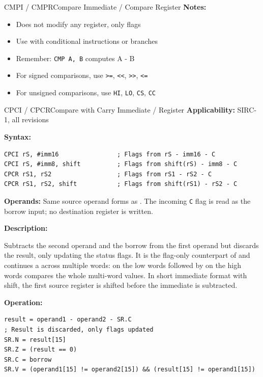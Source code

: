 \begin{instructionbox}{CMPI / CMPR}{Compare Immediate / Compare Register}
	\textbf{Notes:}
	\begin{itemize}
		\item Does not modify any register, only flags
		\item Use with conditional instructions or branches
		\item Remember: \texttt{CMP A, B} computes A - B
		\item For signed comparisons, use \texttt{>=}, \texttt{<<}, \texttt{>>}, \texttt{<=}
		\item For unsigned comparisons, use \texttt{HI}, \texttt{LO}, \texttt{CS}, \texttt{CC}
	\end{itemize}
\end{instructionbox}

\begin{instructionbox}{CPCI / CPCR}{Compare with Carry Immediate / Register}
	\textbf{Applicability:} SIRC-1, all revisions

	\textbf{Syntax:}
	\begin{lstlisting}
CPCI rS, #imm16                ; Flags from rS - imm16 - C
CPCI rS, #imm8, shift          ; Flags from shift(rS) - imm8 - C
CPCR rS1, rS2                  ; Flags from rS1 - rS2 - C
CPCR rS1, rS2, shift           ; Flags from shift(rS1) - rS2 - C
\end{lstlisting}

	\textbf{Operands:} Same source operand forms as . The incoming \texttt{C} flag is read as the borrow
	input; no destination register is written.

	\textbf{Description:}

	Subtracts the second operand and the borrow from the first operand but discards the result, only updating the status
	flags. It is the flag-only counterpart of  and continues a  across multiple words:
	 on the low words followed by  on the high words compares the whole multi-word values. In
	short immediate format with shift, the first source register is shifted before the immediate is subtracted.

	\textbf{Operation:}
	\begin{verbatim}
result = operand1 - operand2 - SR.C
; Result is discarded, only flags updated
SR.N = result[15]
SR.Z = (result == 0)
SR.C = borrow
SR.V = (operand1[15] != operand2[15]) && (result[15] != operand1[15])
\end{verbatim}


\end{instructionbox}
